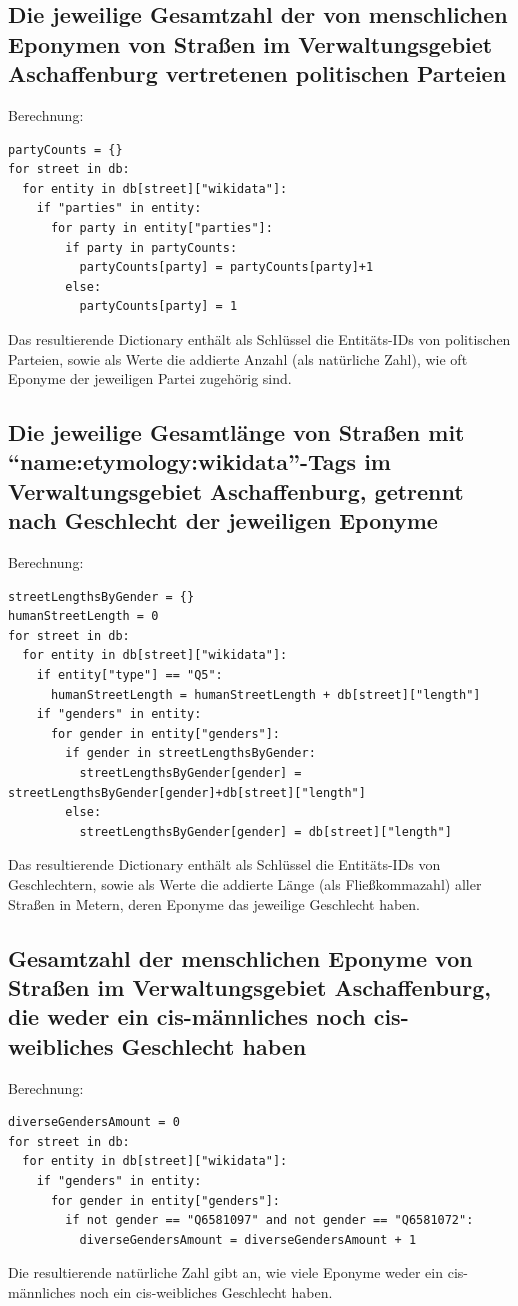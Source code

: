 \documentclass[ngerman,twocolumn,showpacs,%
  nofootinbib,aps,superscriptaddress,%
  eqsecnum,prd,notitlepage,showkeys,10pt,report]{revtex4-2}
\begin{document}
\subsection{Die jeweilige Gesamtzahl der von menschlichen Eponymen von Straßen
im Verwaltungsgebiet Aschaffenburg vertretenen politischen Parteien}
Berechnung:
\begin{lstlisting}
partyCounts = {}
for street in db:
  for entity in db[street]["wikidata"]:
    if "parties" in entity:
      for party in entity["parties"]:
        if party in partyCounts:
          partyCounts[party] = partyCounts[party]+1
        else:
          partyCounts[party] = 1
\end{lstlisting}
Das resultierende Dictionary enthält als Schlüssel die Entitäts-IDs von politischen Parteien,
sowie als Werte die addierte Anzahl (als natürliche Zahl), wie oft Eponyme der jeweiligen
Partei zugehörig sind.

\subsection{Die jeweilige Gesamtlänge von Straßen mit
“name:etymology:wikidata”-Tags im Verwaltungsgebiet Aschaffenburg,
getrennt nach Geschlecht der jeweiligen Eponyme}
Berechnung:
\begin{lstlisting}
streetLengthsByGender = {}
humanStreetLength = 0
for street in db:
  for entity in db[street]["wikidata"]:
    if entity["type"] == "Q5":
      humanStreetLength = humanStreetLength + db[street]["length"]
    if "genders" in entity:
      for gender in entity["genders"]:
        if gender in streetLengthsByGender:
          streetLengthsByGender[gender] =
streetLengthsByGender[gender]+db[street]["length"]
        else:
          streetLengthsByGender[gender] = db[street]["length"]
\end{lstlisting}
Das resultierende Dictionary enthält als Schlüssel die Entitäts-IDs von Geschlechtern, sowie
als Werte die addierte Länge (als Fließkommazahl) aller Straßen in Metern, deren Eponyme
das jeweilige Geschlecht haben.

\subsection{Gesamtzahl der menschlichen Eponyme von Straßen im
Verwaltungsgebiet Aschaffenburg, die weder ein cis-männliches noch
cis-weibliches Geschlecht haben}
Berechnung:
\begin{lstlisting}
diverseGendersAmount = 0
for street in db:
  for entity in db[street]["wikidata"]:
    if "genders" in entity:
      for gender in entity["genders"]:
        if not gender == "Q6581097" and not gender == "Q6581072":
          diverseGendersAmount = diverseGendersAmount + 1
\end{lstlisting}
Die resultierende natürliche Zahl gibt an, wie viele Eponyme weder ein cis-männliches noch
ein cis-weibliches Geschlecht haben.
\end{document}
